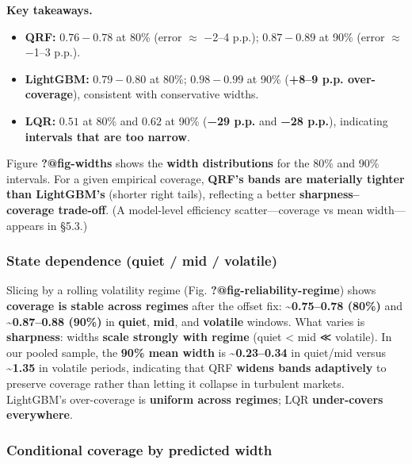 \documentclass[
  a4paper,
  DIV=11,
  numbers=noendperiod]{scrreprt}
\providecommand{\tightlist}{%
  \setlength{\itemsep}{0pt}\setlength{\parskip}{0pt}}
\begin{document}
\textbf{Key takeaways.}

\begin{itemize}
\tightlist
\item
  \textbf{QRF:} \(0.76\!\!-\!0.78\) at 80\% (error \(\approx\) −2--4
  p.p.); \(0.87\!\!-\!0.89\) at 90\% (error \(\approx\) −1--3 p.p.).
\item
  \textbf{LightGBM:} \(0.79\!\!-\!0.80\) at 80\%; \(0.98\!\!-\!0.99\) at
  90\% (\textbf{+8--9 p.p. over-coverage}), consistent with conservative
  widths.
\item
  \textbf{LQR:} \(0.51\) at 80\% and \(0.62\) at 90\% (\textbf{−29 p.p.}
  and \textbf{−28 p.p.}), indicating \textbf{intervals that are too
  narrow}.
\end{itemize}

Figure \textbf{?@fig-widths} shows the \textbf{width distributions} for
the 80\% and 90\% intervals. For a given empirical coverage,
\textbf{QRF's bands are materially tighter than LightGBM's} (shorter
right tails), reflecting a better \textbf{sharpness--coverage
trade-off}. (A model-level efficiency scatter---coverage vs mean
width---appears in §5.3.)

\subsubsection{State dependence (quiet / mid /
volatile)}\label{state-dependence-quiet-mid-volatile}

Slicing by a rolling volatility regime (Fig.
\textbf{?@fig-reliability-regime}) shows \textbf{coverage is stable
across regimes} after the offset fix: \textbf{\textasciitilde0.75--0.78
(80\%)} and \textbf{\textasciitilde0.87--0.88 (90\%)} in \textbf{quiet},
\textbf{mid}, and \textbf{volatile} windows. What varies is
\textbf{sharpness}: widths \textbf{scale strongly with regime} (quiet
\textless{} mid ≪ volatile). In our pooled sample, the \textbf{90\% mean
width} is \textasciitilde{}\textbf{0.23--0.34} in quiet/mid versus
\textasciitilde{}\textbf{1.35} in volatile periods, indicating that QRF
\textbf{widens bands adaptively} to preserve coverage rather than
letting it collapse in turbulent markets. LightGBM's over-coverage is
\textbf{uniform across regimes}; LQR \textbf{under-covers everywhere}.

\subsubsection{Conditional coverage by predicted
width}\label{conditional-coverage-by-predicted-width}
\end{document}
